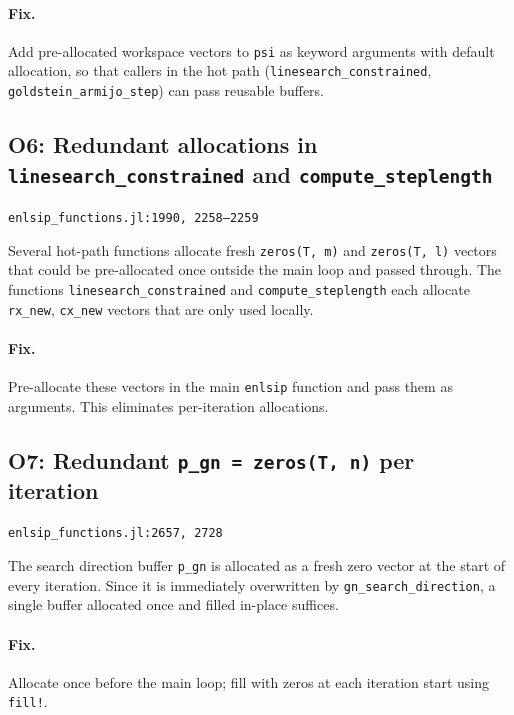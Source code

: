 \documentclass[11pt, a4paper]{article}
\newcommand{\juliaref}[2]{\texttt{#1:#2}}
\begin{document}
\paragraph{Fix.}
Add pre-allocated workspace vectors to \texttt{psi} as keyword arguments
with default allocation, so that callers in the hot path
(\texttt{linesearch\_constrained}, \texttt{goldstein\_armijo\_step}) can
pass reusable buffers.

\subsection{O6: Redundant allocations in \texttt{linesearch\_constrained}
  and \texttt{compute\_steplength}}
\label{sec:o6}

\juliaref{enlsip\_functions.jl}{1990, 2258--2259}

Several hot-path functions allocate fresh \texttt{zeros(T, m)} and
\texttt{zeros(T, l)} vectors that could be pre-allocated once outside
the main loop and passed through.  The functions
\texttt{linesearch\_constrained} and \texttt{compute\_steplength} each
allocate \texttt{rx\_new}, \texttt{cx\_new} vectors that are only used
locally.

\paragraph{Fix.}
Pre-allocate these vectors in the main \texttt{enlsip} function and
pass them as arguments.  This eliminates per-iteration allocations.

\subsection{O7: Redundant \texttt{p\_gn = zeros(T, n)} per iteration}
\label{sec:o7}

\juliaref{enlsip\_functions.jl}{2657, 2728}

The search direction buffer \texttt{p\_gn} is allocated as a fresh
zero vector at the start of every iteration.  Since it is immediately
overwritten by \texttt{gn\_search\_direction}, a single buffer allocated
once and filled in-place suffices.

\paragraph{Fix.}
Allocate once before the main loop; fill with zeros at each iteration
start using \texttt{fill!}.
\end{document}
